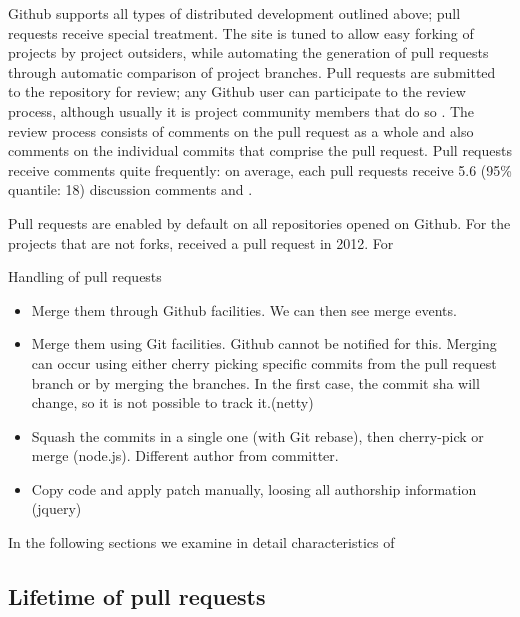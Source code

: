 \documentclass[conference]{IEEEtran}
\begin{document}
Github supports all types of distributed development outlined above;
pull requests receive special treatment. The site is tuned to allow easy forking
of projects by project outsiders, while automating the generation of pull
requests through automatic comparison of project branches. Pull requests are
submitted to the repository for review; any Github user can participate to the
review process, although usually it is project community members that do so
. The
review process consists of comments on the pull request as a whole and also
comments on the individual commits that comprise the pull request.
Pull requests receive comments quite frequently: on average, each pull
requests receive 5.6 (95\% quantile: 18) discussion comments and .

Pull requests are enabled by default on all repositories opened on Github.
For the projects that are not forks, 
received a pull request in 2012. For 

Handling of pull requests

\begin{itemize}

  \item Merge them through Github facilities. We can then see merge events.

  \item  Merge them using Git facilities. Github cannot be notified for this. Merging can occur using either cherry picking specific commits from the pull request branch or by merging the branches. In the first case, the commit sha will change, so it is not possible to track it.(netty)

  \item Squash the commits in a single one (with Git rebase), then cherry-pick or merge (node.js). Different author from committer. 

  \item Copy code and apply patch manually, loosing all authorship information
    (jquery)

\end{itemize}

In the following sections we examine in detail characteristics of 

\subsection{Lifetime of pull requests}
\end{document}
